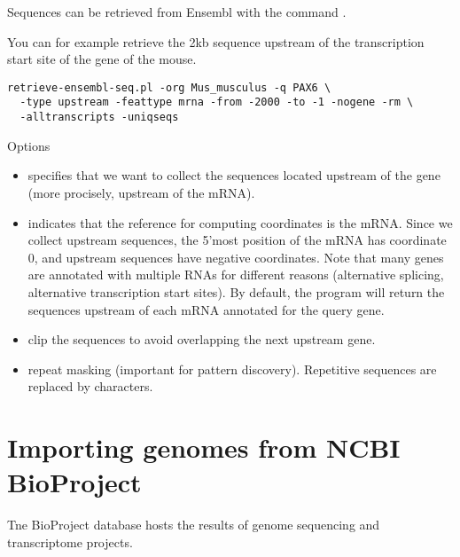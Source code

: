 Sequences can be retrieved from Ensembl with the command
. 

You can for example retrieve the 2kb sequence upstream of the
transcription start site of the gene  of the mouse. 

\begin{lstlisting}
retrieve-ensembl-seq.pl -org Mus_musculus -q PAX6 \
  -type upstream -feattype mrna -from -2000 -to -1 -nogene -rm \
  -alltranscripts -uniqseqs
\end{lstlisting}

Options

\begin{itemize}

\item {} specifies that we want to collect the
  sequences located upstream of the gene (more procisely, upstream of
  the mRNA).

\item {} indicates that the reference for computing
  coordinates is the mRNA. Since we collect upstream sequences, the
  5'most position of the mRNA has coordinate 0, and upstream sequences
  have negative coordinates. Note that many genes are annotated with
  multiple RNAs for different reasons (alternative splicing,
  alternative transcription start sites). By default, the program will
  return the sequences upstream of each mRNA annotated for the query
  gene.

\item {} clip the sequences to avoid overlapping the next
  upstream gene.

\item {} repeat masking (important for pattern
  discovery). Repetitive sequences are replaced by  characters.

\end{itemize} 



\section{Importing genomes from NCBI BioProject}

Tne BioProject database hosts the results of genome sequencing and
transcriptome projects. 

